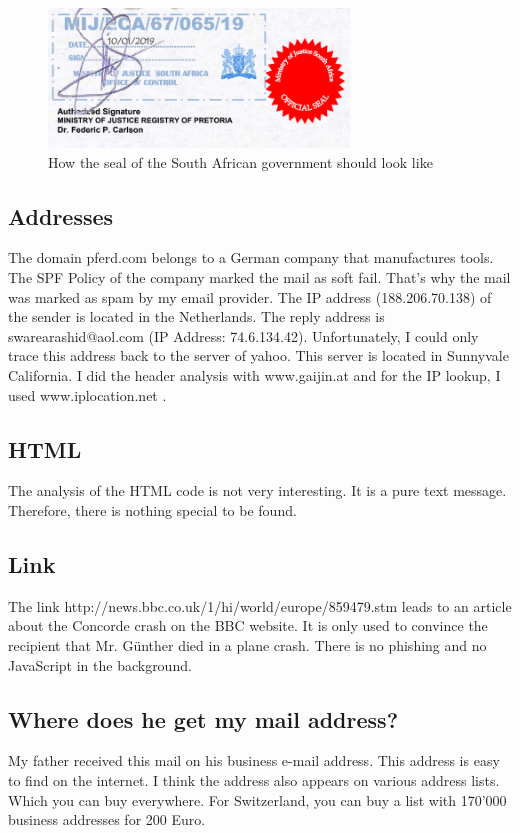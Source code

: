 \documentclass[12pt]{article}
\begin{document}
\begin{figure}[h]
 \includegraphics[width=8cm]{seal.png}
  \centering
  \caption{How the seal of the South African government should look like}
  \label{fig:seal}
\end{figure}

\subsection{Addresses}
The domain pferd.com belongs to a German company that manufactures tools. The SPF Policy of the company marked the mail as soft fail. That's why the mail was marked as spam by my email provider.  The IP address (188.206.70.138) of the sender is located in the Netherlands. The reply address is swarearashid@aol.com (IP Address: 74.6.134.42). Unfortunately, I could only trace this address back to the server of yahoo. This server is located in Sunnyvale California.
I did the header analysis with www.gaijin.at \cite{mailHeader} and for the IP lookup, I used www.iplocation.net \cite{iploc}.

\subsection{HTML}
The analysis of the HTML code is not very interesting. It is a pure text message. Therefore, there is nothing special to be found. 

\subsection{Link}
The link http://news.bbc.co.uk/1/hi/world/europe/859479.stm  leads to an article about the Concorde crash on the BBC website. It is only used to convince the recipient that Mr. Günther died in a plane crash. There is no phishing and no JavaScript in the background. 

\subsection{Where does he get my mail address?}
My father received this mail on his business e-mail address. This address is easy to find on the internet. I think the address also appears on various address lists. Which you can buy everywhere. For Switzerland, you can buy a list with 170’000 business addresses for 200 Euro.
\end{document}
